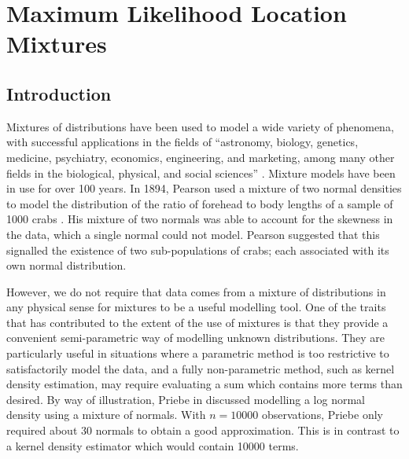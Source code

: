 \chapter{Maximum Likelihood Location Mixtures}
\label{Ch:Mixtures}


\graphicspath{{Figures/Mixtures/}}


\section{Introduction}
	Mixtures of distributions have been used to model a wide variety of phenomena, with successful applications in the fields of ``astronomy, biology, genetics, medicine, psychiatry, economics, engineering, and marketing, among many other fields in the biological, physical, and social sciences'' \cite[Section 1.1.1]{McLachlan2004-ik}. Mixture models have been in use for over 100 years. In 1894, Pearson used a mixture of two normal densities to model the distribution of the ratio of forehead to body lengths of a sample of 1000 crabs \cite{Pearson1894-qv}. His mixture of two normals was able to account for the skewness in the data, which a single normal could not model. Pearson suggested that this signalled the existence of two sub-populations of crabs; each associated with its own normal distribution.

	However, we do not require that data comes from a mixture of distributions in any physical sense for mixtures to be a useful modelling tool. 
	One of the traits that has contributed to the extent of the use of mixtures is that they provide a convenient semi-parametric way of modelling unknown distributions. They are particularly useful in situations where a parametric method is too restrictive to satisfactorily model the data, and a fully non-parametric method, such as kernel density estimation, may require evaluating a sum which contains more terms than desired. By way of illustration, Priebe in \cite{Priebe1994-ng} discussed modelling a log normal density using a mixture of normals. With $n = 10000$ observations, Priebe only required about 30 normals to obtain a good approximation. This is in contrast to a kernel density estimator which would contain 10000 terms.

